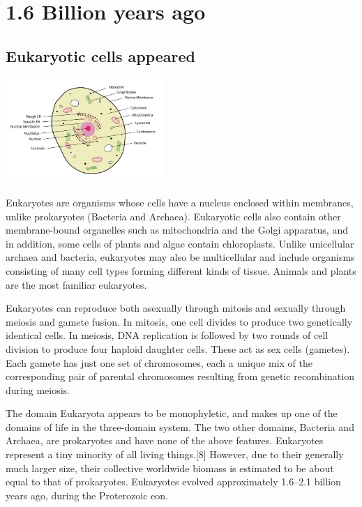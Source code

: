 \documentclass[11pt]{report}
\begin{document}
\chapter{1.6 Billion years ago}
\section{Eukaryotic cells appeared}
\vspace{2mm}\begin{center}\includegraphics[width=6cm]{./img/eukaryoticCell.jpg}\end{center}
Eukaryotes are organisms whose cells have a nucleus enclosed within membranes, unlike prokaryotes (Bacteria and Archaea). Eukaryotic cells also contain other membrane-bound organelles such as mitochondria and the Golgi apparatus, and in addition, some cells of plants and algae contain chloroplasts. Unlike unicellular archaea and bacteria, eukaryotes may also be multicellular and include organisms consisting of many cell types forming different kinds of tissue. Animals and plants are the most familiar eukaryotes.

Eukaryotes can reproduce both asexually through mitosis and sexually through meiosis and gamete fusion. In mitosis, one cell divides to produce two genetically identical cells. In meiosis, DNA replication is followed by two rounds of cell division to produce four haploid daughter cells. These act as sex cells (gametes). Each gamete has just one set of chromosomes, each a unique mix of the corresponding pair of parental chromosomes resulting from genetic recombination during meiosis.

The domain Eukaryota appears to be monophyletic, and makes up one of the domains of life in the three-domain system. The two other domains, Bacteria and Archaea, are prokaryotes and have none of the above features. Eukaryotes represent a tiny minority of all living things.[8] However, due to their generally much larger size, their collective worldwide biomass is estimated to be about equal to that of prokaryotes. Eukaryotes evolved approximately 1.6–2.1 billion years ago, during the Proterozoic eon.
\end{document}
